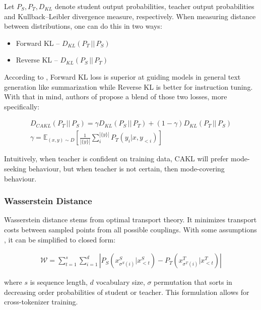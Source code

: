 \documentclass{article}
\begin{document}
Let \(P_S, P_T, D_{KL}\) denote student output probabilities, teacher output probabilities and Kullback–Leibler divergence measure, respectively. When measuring distance between distributions, one can do this in two ways:

\begin{itemize}
    \item Forward KL -- \(D_{KL} (P_T \,||\, P_S)\)
    \item Reverse KL -- \(D_{KL} (P_S \,||\, P_T)\)
\end{itemize}

According to \cite{du2024bitdistillerunleashingpotentialsub4bit}, Forward KL loss is superior at guiding models in general text generation like summarization while Reverse KL is better for instruction tuning. With that in mind, authors of \cite{du2024bitdistillerunleashingpotentialsub4bit} propose a blend of those two losses, more specifically:

\begin{gather*}
    D_{CAKL} (P_T \,||\, P_S) = \gamma D_{KL} (P_S \,||\, P_T) + (1 - \gamma) D_{KL} (P_T \,||\, P_S) \\
    \gamma = \mathbb{E}_{(x, y) \sim D}\left[\frac{1}{|\{y\}|}\sum^{|\{y\}|}_i P_T(y_i | x, y_{<i}) \right]
\end{gather*}

Intuitively, when teacher is confident on training data, CAKL will prefer mode-seeking behaviour, but when teacher is not certain, then mode-covering behaviour.

\subsubsection{Wasserstein Distance}

Wasserstein distance stems from optimal transport theory. It minimizes transport costs between sampled points from
all possible couplings. With some assumptions \cite{boizard2025crosstokenizerdistillationuniversallogit}, it can be simplified to closed form:

\begin{gather*}
    \mathcal{W} = \sum^s_{t=1}\sum^d_{i=1}\left|P_S(x^S_{\sigma^S(i)} | x^S_{<t}) - P_T(x^T_{\sigma^T(i)} | x^T_{<t})\right|
\end{gather*}

where \(s\) is sequence length, \(d\) vocabulary size, \(\sigma\) permutation that sorts in decreasing order probabilities of student or teacher. This formulation allows for cross-tokenizer training.
\end{document}

